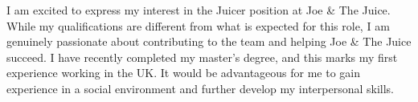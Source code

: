 \documentclass[../main.tex]{subfiles}
\begin{document}
\begin{cvletter}






\makelettertitle

\begin{cvletter}

I am excited to express my interest in the Juicer position at Joe \& The Juice. While my qualifications are different from what is expected for this role, I am genuinely passionate about contributing to the team and helping Joe \& The Juice succeed. I have recently completed my master’s degree, and this marks my first experience working in the UK. It would be advantageous for me to gain experience in a social environment and further develop my interpersonal skills.


\end{cvletter}
\end{cvletter}
\end{document}
